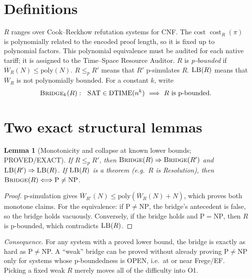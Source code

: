 \documentclass[11pt]{article}
\newtheorem{lemma}[theorem]{Lemma}
\theoremstyle{definition}
\newcommand{\Wbar}{\overline W}
\newcommand{\SAT}{\mathrm{SAT}}
\newcommand{\Time}{\mathrm{DTIME}}
\begin{document}
\section{Definitions}

$R$ ranges over Cook--Reckhow refutation systems for CNF. The cost $\operatorname{cost}_R(\pi)$
is polynomially related to the encoded proof length, so it is fixed up to polynomial factors.
This polynomial equivalence must be audited for each native tariff; it is assigned to the
Time--Space Resource Auditor. $R$ is \emph{p-bounded} if $\Wbar_R(N)\le\mathrm{poly}(N)$.
$R\le_p R'$ means that $R'$ p-simulates $R$.
$\textsc{LB}(R)$ means that $\Wbar_R$ is not polynomially bounded.
For a constant $k$, write
\[
\textsc{Bridge}_k(R):\ \ \SAT\in\Time(n^{k})\ \Longrightarrow\ R \text{ is p-bounded}.
\]

\section{Two exact structural lemmas}

\begin{lemma}[Monotonicity and collapse at known lower bounds; PROVED/EXACT]\label{lem:mono}
If $R\le_p R'$, then $\textsc{Bridge}(R)\Rightarrow\textsc{Bridge}(R')$ and
$\textsc{LB}(R')\Rightarrow\textsc{LB}(R)$. If $\textsc{LB}(R)$ is a theorem (e.g.\ $R$ is
Resolution), then $\textsc{Bridge}(R)\Longleftrightarrow \mathrm P\ne\mathrm{NP}$.
\end{lemma}
\begin{proof}
p-simulation gives $\Wbar_{R'}(N)\le\mathrm{poly}(\Wbar_R(N)+N)$, which proves both monotone
claims. For the equivalence: if $\mathrm P\ne\mathrm{NP}$, the bridge's antecedent is false, so
the bridge holds vacuously. Conversely, if the bridge holds and $\mathrm P=\mathrm{NP}$, then
$R$ is p-bounded, which contradicts $\textsc{LB}(R)$.
\end{proof}
\noindent\emph{Consequence.} For any system with a proved lower bound, the bridge is exactly as
hard as P$\ne$NP. A ``weak'' bridge can be proved without already proving P$\ne$NP only for
systems whose p-boundedness is OPEN, i.e.\ at or near Frege/EF. Picking a fixed weak $R$
merely moves all of the difficulty into O1.
\end{document}

